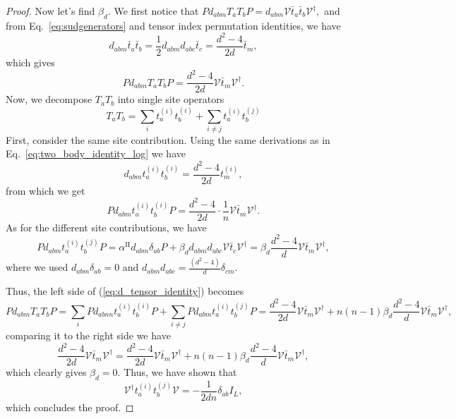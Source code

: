 \documentclass[10pt,twocolumn,superscriptaddress,aps,amsmath,amssymb,citeautoscript,floatfix,prx]{revtex4-2}
\theoremstyle{plain}
\theoremstyle{plain}
\theoremstyle{plain}
\theoremstyle{plain}
\theoremstyle{plain}
\theoremstyle{plain}
\theoremstyle{plain}
\theoremstyle{definition}
\theoremstyle{plain}
\begin{document}
\begin{appendix}
\begin{proof}
Now let's find $\beta_{d}$. We first notice that
$
    P d_{a b m} T_a T_b P=d_{a b m} \mathcal{V} \bar{t}_a \bar{t}_b \mathcal{V}^{\dagger},
$
and from Eq.~\eqref{eq:sudgenerators} and tensor index permutation identities, we have
\begin{equation}\label{eq:two_body_identity_log}
    d_{a b m} \bar{t}_a \bar{t}_b=\frac{1}{2} d_{a b m} d_{a b c} \bar{t}_c=\frac{d^2-4}{2 d} \bar{t}_m,
\end{equation}
which gives
\begin{equation}\label{eq:d_tensor_identity}
    P d_{a b m} T_a T_b P=\frac{d^2-4}{2 d} \mathcal{V}\bar{t}_m \mathcal{V}^{\dagger}.
\end{equation}
Now, we decompose $T_a T_b$ into single site operators 
\[
    T_a T_b=\sum_i t_a^{(i)} t_b^{(i)}+\sum_{i \neq j} t_a^{(i)} t_b^{(j)}
\]
First, consider the same site contribution. Using the same derivations as in Eq.~\eqref{eq:two_body_identity_log} we have
\[
    d_{a b m} t_a^{(i)} t_b^{(i)}=\frac{d^2-4}{2 d} t_m^{(i)},
\]
from which we get
\[
    P d_{a b m} t_a^{(i)} t_b^{(i)} P=\frac{d^2-4}{2 d} \cdot \frac{1}{n} \mathcal{V}\bar{t}_m \mathcal{V}^{\dagger}.
\]
As for the different site contributions, we have
\[
    P d_{a b m} t_a^{(i)} t_b^{(j)} P=\alpha^{\text{II}} d_{a b m} \delta_{a b} P+\beta_{d} d_{a b m} d_{a bc} \mathcal{V} \bar{t}_c \mathcal{V}^{\dagger}=\beta_{d} \frac{d^2-4}{d} \mathcal{V} \bar{t}_m \mathcal{V}^{\dagger},
\]
where we used $d_{a b m} \delta_{a b}=0$ and $d_{a b m} d_{a b c}=\frac{\left(d^2-4\right)}{d} \delta_{cm}$.

Thus, the left side of (\ref{eq:d_tensor_identity}) becomes
\[
    P d_{a b m} T_a T_b P=\sum_i P d_{a b n n} t_a^{(i)} t_b^{(i)} P+\sum_{i \neq j} P d_{a b m} t_a^{(i)} t_b^{(j)} P=\frac{d^2-4}{2 d} 
    \mathcal{V}\bar{t}_m \mathcal{V}^{\dagger}+n(n-1) \beta_{d} \frac{d^2-4}{d} \mathcal{V} \bar{t}_m \mathcal{V}^{\dagger},
\]
comparing it to the right side we have
\[
\frac{d^2-4}{2 d} \mathcal{V}\bar{t}_m \mathcal{V}^{\dagger}=\frac{d^2-4}{2 d} \mathcal{V}\bar{t}_m \mathcal{V}^{\dagger}+n(n-1) \beta_{d} \frac{d^2-4}{d} \mathcal{V} \bar{t}_m \mathcal{V}^{\dagger},
\]
which clearly gives $\beta_{d}=0$. Thus, we have shown that
\[
    \mathcal{V}^{\dagger} t_a^{(i)} t_b^{(j)} \mathcal{V}=-\frac{1}{2 d n} \delta_{a b} I_L,
\]
which concludes the proof.
\end{proof}


\end{appendix}
\end{document}
